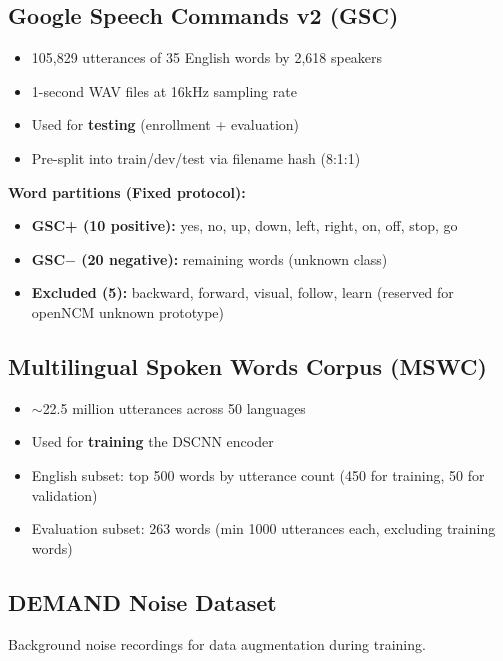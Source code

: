 \documentclass[12pt,a4paper]{report}
\begin{document}
\subsection{Google Speech Commands v2 (GSC)}

\begin{itemize}
    \item 105,829 utterances of 35 English words by 2,618 speakers
    \item 1-second WAV files at 16kHz sampling rate
    \item Used for \textbf{testing} (enrollment + evaluation)
    \item Pre-split into train/dev/test via filename hash (8:1:1)
\end{itemize}

\textbf{Word partitions (Fixed protocol):}
\begin{itemize}
    \item \textbf{GSC+ (10 positive):} yes, no, up, down, left, right, on,
          off, stop, go
    \item \textbf{GSC$-$ (20 negative):} remaining words (unknown class)
    \item \textbf{Excluded (5):} backward, forward, visual, follow, learn
          (reserved for openNCM unknown prototype)
\end{itemize}

\subsection{Multilingual Spoken Words Corpus (MSWC)}

\begin{itemize}
    \item $\sim$22.5 million utterances across 50 languages
    \item Used for \textbf{training} the DSCNN encoder
    \item English subset: top 500 words by utterance count (450 for training, 50 for validation)
    \item Evaluation subset: 263 words (min 1000 utterances each, excluding
          training words)
\end{itemize}

\subsection{DEMAND Noise Dataset}

Background noise recordings for data augmentation during training.
\end{document}

